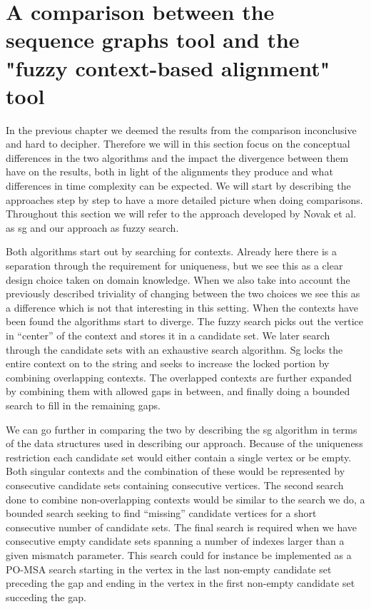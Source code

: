 \documentclass[thesis.tex]{subfiles}
\begin{document}
\section{A comparison between the sequence graphs tool and the "fuzzy context-based alignment" tool}
In the previous chapter we deemed the results from the comparison inconclusive and hard to decipher. Therefore we will in this section focus on the conceptual differences in the two algorithms and the impact the divergence between them have on the results, both in light of the alignments they produce and what differences in time complexity can be expected. We will start by describing the approaches step by step to have a more detailed picture when doing comparisons. Throughout this section we will refer to the approach developed by Novak et al. as sg and our approach as fuzzy search.\\
\par\noindent
Both algorithms start out by searching for contexts. Already here there is a separation through the requirement for uniqueness, but we see this as a clear design choice taken on domain knowledge. When we also take into account the previously described triviality of changing between the two choices we see this as a difference which is not that interesting in this setting. When the contexts have been found the algorithms start to diverge. The fuzzy search picks out the vertice in ``center'' of the context and stores it in a candidate set. We later search through the candidate sets with an exhaustive search algorithm. Sg locks the entire context on to the string and seeks to increase the locked portion by combining overlapping contexts. The overlapped contexts are further expanded by combining them with allowed gaps in between, and finally doing a bounded search to fill in the remaining gaps.\\
\par\noindent
We can go further in comparing the two by describing the sg algorithm in terms of the data structures used in describing our approach. Because of the uniqueness restriction each candidate set would either contain a single vertex or be empty. Both singular contexts and the combination of these would be represented by consecutive candidate sets containing consecutive vertices. The second search done to combine non-overlapping contexts would be similar to the search we do, a bounded search seeking to find ``missing'' candidate vertices for a short consecutive number of candidate sets. The final search is required when we have consecutive empty candidate sets spanning a number of indexes larger than a given mismatch parameter. This search could for instance be implemented as a PO-MSA search starting in the vertex in the last non-empty candidate set preceding the gap and ending in the vertex in the first non-empty candidate set succeding the gap.\\
\end{document}
